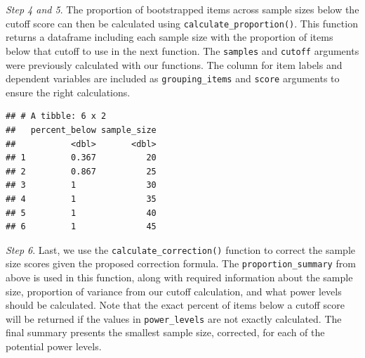 \documentclass[
  man]{apa7}
\newenvironment{Shaded}{\begin{snugshade}}{\end{snugshade}}
\newcommand{\AttributeTok}[1]{\textcolor[rgb]{0.13,0.29,0.53}{#1}}
\newcommand{\CommentTok}[1]{\textcolor[rgb]{0.56,0.35,0.01}{\textit{#1}}}
\newcommand{\FunctionTok}[1]{\textcolor[rgb]{0.13,0.29,0.53}{\textbf{#1}}}
\newcommand{\NormalTok}[1]{#1}
\newcommand{\OtherTok}[1]{\textcolor[rgb]{0.56,0.35,0.01}{#1}}
\newcommand{\SpecialCharTok}[1]{\textcolor[rgb]{0.81,0.36,0.00}{\textbf{#1}}}
\newcommand{\StringTok}[1]{\textcolor[rgb]{0.31,0.60,0.02}{#1}}
\begin{document}
\emph{Step 4 and 5}. The proportion of bootstrapped items across sample sizes below the cutoff score can then be calculated using \texttt{calculate\_proportion()}. This function returns a dataframe including each sample size with the proportion of items below that cutoff to use in the next function. The \texttt{samples} and \texttt{cutoff} arguments were previously calculated with our functions. The column for item labels and dependent variables are included as \texttt{grouping\_items} and \texttt{score} arguments to ensure the right calculations.

\begin{Shaded}
\end{Shaded}

\begin{verbatim}
## # A tibble: 6 x 2
##   percent_below sample_size
##           <dbl>       <dbl>
## 1         0.367          20
## 2         0.867          25
## 3         1              30
## 4         1              35
## 5         1              40
## 6         1              45
\end{verbatim}

\emph{Step 6}. Last, we use the \texttt{calculate\_correction()} function to correct the sample size scores given the proposed correction formula. The \texttt{proportion\_summary} from above is used in this function, along with required information about the sample size, proportion of variance from our cutoff calculation, and what power levels should be calculated. Note that the exact percent of items below a cutoff score will be returned if the values in \texttt{power\_levels} are not exactly calculated. The final summary presents the smallest sample size, corrected, for each of the potential power levels.
\end{document}
